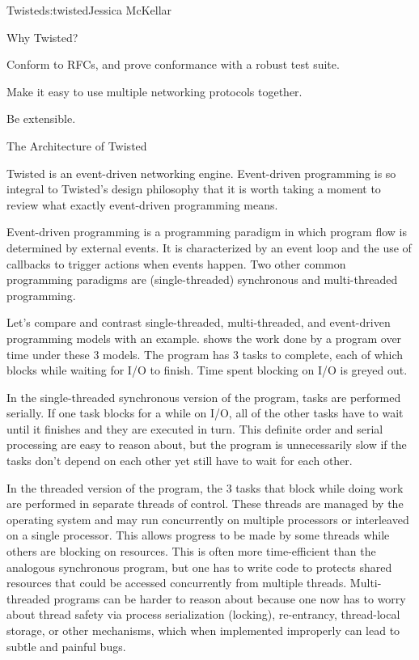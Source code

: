 \begin{aosachapter}{Twisted}{s:twisted}{Jessica McKellar}
\begin{aosasect1}{Why Twisted?}
\begin{aosaitemize}
\item Conform to RFCs, and prove conformance with a robust test suite.

\item Make it easy to use multiple networking protocols together.

\item Be extensible.

\end{aosaitemize}

\end{aosasect1}

\begin{aosasect1}{The Architecture of Twisted}

Twisted is an event-driven networking engine. Event-driven programming is so
integral to Twisted's design philosophy that it is worth taking a moment to
review what exactly event-driven programming means.

Event-driven programming is a programming paradigm in which program flow is
determined by external events. It is characterized by an event loop and the use
of callbacks to trigger actions when events happen. Two other common
programming paradigms are (single-threaded) synchronous and multi-threaded
programming.


Let's compare and contrast single-threaded, multi-threaded, and
event-driven programming models with an example.
 shows the work done by a
program over time under these 3 models. The program has 3 tasks to
complete, each of which blocks while waiting for I/O to finish. Time
spent blocking on I/O is greyed out.

In the single-threaded synchronous version of the program, tasks are
performed serially. If one task blocks for a while on I/O, all of the other
tasks have to wait until it finishes and they are executed in turn. This
definite order and serial processing are easy to reason about, but the program
is unnecessarily slow if the tasks don't depend on each other yet still have to
wait for each other.

In the threaded version of the program, the 3 tasks that block while doing
work are performed in separate threads of control. These threads are managed by
the operating system and may run concurrently on multiple processors or
interleaved on a single processor. This allows progress to be made by some
threads while others are blocking on resources. This is often more
time-efficient than the analogous synchronous program, but one has to write code
to protects shared resources that could be accessed concurrently from multiple
threads. Multi-threaded programs can be harder to reason about because one now
has to worry about thread safety via process serialization (locking),
re-entrancy, thread-local storage, or other mechanisms, which when implemented
improperly can lead to subtle and painful bugs.


\end{aosasect1}
\end{aosachapter}
